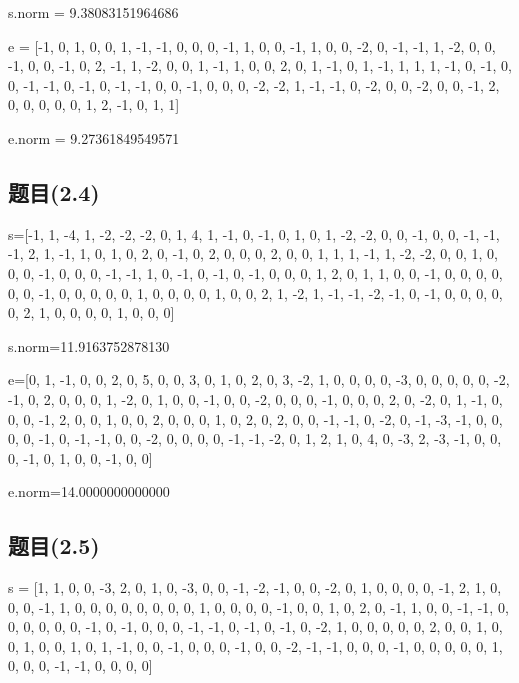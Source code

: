\documentclass[12pt,a4paper]{article}
\numberwithin{equation}{section}
\begin{document}
s.norm = 9.38083151964686

\hspace*{\fill}

e = [-1, 0, 1, 0, 0, 1, -1, -1, 0, 0, 0, -1, 1, 0, 0, -1, 1, 0, 0, -2, 0, -1, -1, 1, -2, 0, 0, -1, 0, 0, -1, 0, 2, -1, 1, -2, 0, 0, 1, -1, 1, 0, 0, 2, 0, 1, -1, 0, 1, -1, 1, 1, 1, -1, 0, -1, 0, 0, -1, -1, 0, -1, 0, -1, -1, 0, 0, -1, 0, 0, 0, -2, -2, 1, -1, -1, 0, -2, 0, 0, -2, 0, 0, -1, 2, 0, 0, 0, 0, 0, 1, 2, -1, 0, 1, 1]

e.norm = 9.27361849549571

\subsection{题目(2.4)}

s=[-1, 1, -4, 1, -2, -2, -2, 0, 1, 4, 1, -1, 0, -1, 0, 1, 0, 1, -2, -2, 0, 0, -1, 0, 0, -1, -1, -1, 2, 1, -1, 1, 0, 1, 0, 2, 0, -1, 0, 2, 0, 0, 0, 2, 0, 0, 1, 1, 1, -1, 1, -2, -2, 0, 0, 1, 0, 0, 0, -1, 0, 0, 0, -1, -1, 1, 0, -1, 0, -1, 0, -1, 0, 0, 0, 1, 2, 0, 1, 1, 0, 0, -1, 0, 0, 0, 0, 0, 0, -1, 0, 0, 0, 0, 0, 1, 0, 0, 0, 0, 1, 0, 0, 2, 1, -2, 1, -1, -1, -2, -1, 0, -1, 0, 0, 0, 0, 0, 2, 1, 0, 0, 0, 0, 1, 0, 0, 0]

s.norm=11.9163752878130

\hspace*{\fill}

e=[0, 1, -1, 0, 0, 2, 0, 5, 0, 0, 3, 0, 1, 0, 2, 0, 3, -2, 1, 0, 0, 0, 0, -3, 0, 0, 0, 0, 0, -2, -1, 0, 2, 0, 0, 0, 1, -2, 0, 1, 0, 0, -1, 0, 0, -2, 0, 0, 0, -1, 0, 0, 0, 2, 0, -2, 0, 1, -1, 0, 0, 0, -1, 2, 0, 0, 1, 0, 0, 2, 0, 0, 0, 1, 0, 2, 0, 2, 0, 0, -1, -1, 0, -2, 0, -1, -3, -1, 0, 0, 0, 0, -1, 0, -1, -1, 0, 0, -2, 0, 0, 0, 0, -1, -1, -2, 0, 1, 2, 1, 0, 4, 0, -3, 2, -3, -1, 0, 0, 0, -1, 0, 1, 0, 0, -1, 0, 0]

e.norm=14.0000000000000

\subsection{题目(2.5)}

s = [1, 1, 0, 0, -3, 2, 0, 1, 0, -3, 0, 0, -1, -2, -1, 0, 0, -2, 0, 1, 0, 0, 0, 0, -1, 2, 1, 0, 0, 0, -1, 1, 0, 0, 0, 0, 0, 0, 0, 0, 1, 0, 0, 0, 0, -1, 0, 0, 1, 0, 2, 0, -1, 1, 0, 0, -1, -1, 0, 0, 0, 0, 0, 0, -1, 0, -1, 0, 0, 0, -1, -1, 0, -1, 0, -1, 0, -2, 1, 0, 0, 0, 0, 0, 2, 0, 0, 1, 0, 0, 1, 0, 0, 1, 0, 1, -1, 0, 0, -1, 0, 0, 0, -1, 0, 0, -2, -1, -1, 0, 0, 0, -1, 0, 0, 0, 0, 0, 1, 0, 0, 0, -1, -1, 0, 0, 0, 0]
\end{document}
